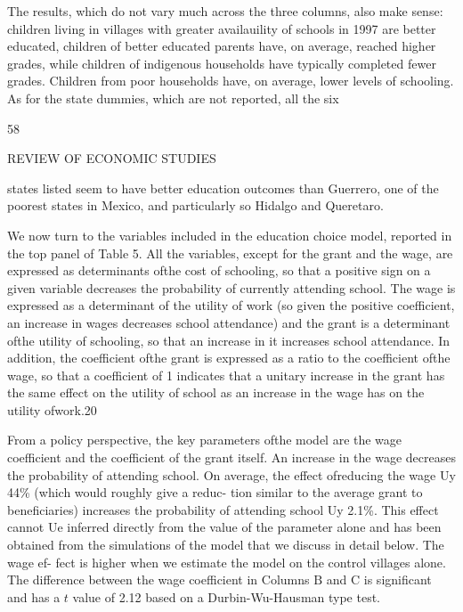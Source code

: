 The results, which do not vary much across the three columns, also make sense: children living in villages with greater availauility of schools in 1997 are better educated, children of better educated parents have, on average, reached higher grades, while children of indigenous households have typically completed fewer grades. Children from poor households have, on average, lower levels of schooling. As for the state dummies, which are not reported, all the six

58

REVIEW OF ECONOMIC STUDIES

states listed seem to have better education outcomes than Guerrero, one of the poorest states in Mexico, and particularly so Hidalgo and Queretaro.

We now turn to the variables included in the education choice model, reported in the top panel of Table 5. All the variables, except for the grant and the wage, are expressed as determinants ofthe cost of schooling, so that a positive sign on a given variable decreases the probability of currently attending school. The wage is expressed as a determinant of the utility of work (so given the positive coefficient, an increase in wages decreases school attendance) and the grant is a determinant ofthe utility of schooling, so that an increase in it increases school attendance. In addition, the coefficient ofthe grant is expressed as a ratio to the coefficient ofthe wage, so that a coefficient of 1 indicates that a unitary increase in the grant has the same effect on the utility of school as an increase in the wage has on the utility ofwork.20

From a policy perspective, the key parameters ofthe model are the wage coefficient and the coefficient of the grant itself. An increase in the wage decreases the probability of attending school. On average, the effect ofreducing the wage Uy 44\% (which would roughly give a reduc- tion similar to the average grant to beneficiaries) increases the probability of attending school Uy 2.1\%. This effect cannot Ue inferred directly from the value of the parameter alone and has been obtained from the simulations of the model that we discuss in detail below. The wage ef- fect is higher when we estimate the model on the control villages alone. The difference between the wage coefficient in Columns $\mathrm{B}$ and $\mathrm{C}$ is significant and has a $t$ value of 2.12 based on a Durbin-Wu-Hausman type test.

